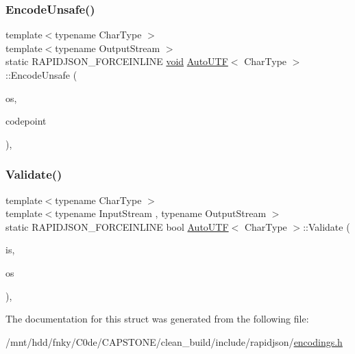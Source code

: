 \subsubsection{\texorpdfstring{Encode\+Unsafe()}{EncodeUnsafe()}}
{\footnotesize\ttfamily template$<$typename Char\+Type $>$ \\
template$<$typename Output\+Stream $>$ \\
static R\+A\+P\+I\+D\+J\+S\+O\+N\+\_\+\+F\+O\+R\+C\+E\+I\+N\+L\+I\+NE \hyperlink{imgui__impl__opengl3__loader_8h_ac668e7cffd9e2e9cfee428b9b2f34fa7}{void} \hyperlink{structAutoUTF}{Auto\+U\+TF}$<$ Char\+Type $>$\+::Encode\+Unsafe (\begin{DoxyParamCaption}\item[{Output\+Stream \&}]{os,  }\item[{unsigned}]{codepoint }\end{DoxyParamCaption})\hspace{0.3cm}{\ttfamily [inline]}, {\ttfamily [static]}}

\mbox{\label{structAutoUTF_a36dd6f226d6a07c12161e21c0aff20b1}} 
\subsubsection{\texorpdfstring{Validate()}{Validate()}}
{\footnotesize\ttfamily template$<$typename Char\+Type $>$ \\
template$<$typename Input\+Stream , typename Output\+Stream $>$ \\
static R\+A\+P\+I\+D\+J\+S\+O\+N\+\_\+\+F\+O\+R\+C\+E\+I\+N\+L\+I\+NE bool \hyperlink{structAutoUTF}{Auto\+U\+TF}$<$ Char\+Type $>$\+::Validate (\begin{DoxyParamCaption}\item[{Input\+Stream \&}]{is,  }\item[{Output\+Stream \&}]{os }\end{DoxyParamCaption})\hspace{0.3cm}{\ttfamily [inline]}, {\ttfamily [static]}}



The documentation for this struct was generated from the following file\+:\begin{DoxyCompactItemize}
\item 
/mnt/hdd/fnky/\+C0de/\+C\+A\+P\+S\+T\+O\+N\+E/clean\+\_\+build/include/rapidjson/\hyperlink{encodings_8h}{encodings.\+h}\end{DoxyCompactItemize}
